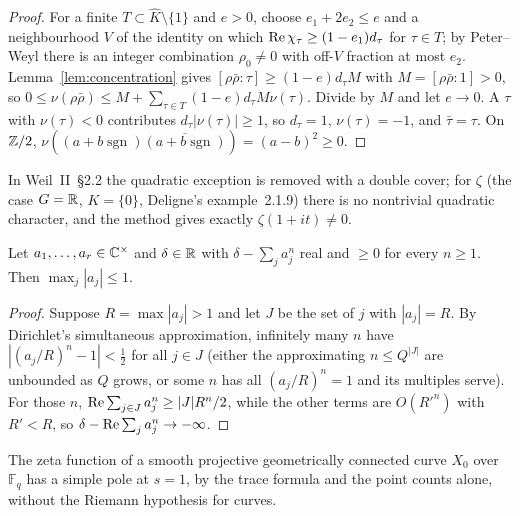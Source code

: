 \begin{proof}
For a finite $T\subset\widehat K\setminus\{1\}$ and $e>0$, choose $e_1+2e_2\le e$ and a neighbourhood $V$ of the identity on which $\operatorname{Re}\chi_\tau\ge(1-e_1)d_\tau$ for $\tau\in T$; by Peter--Weyl there is an integer combination $\rho_0\ne0$ with off-$V$ fraction at most $e_2$. Lemma~\ref{lem:concentration} gives $[\rho\bar\rho:\tau]\ge(1-e)d_\tau M$ with $M=[\rho\bar\rho:1]>0$, so $0\le\nu(\rho\bar\rho)\le M+\sum_{\tau\in T}(1-e)d_\tau M\nu(\tau)$. Divide by $M$ and let $e\to0$. A $\tau$ with $\nu(\tau)<0$ contributes $d_\tau|\nu(\tau)|\ge1$, so $d_\tau=1$, $\nu(\tau)=-1$, and $\bar\tau=\tau$. On $\mathbb{Z}/2$, $\nu((a+b\operatorname{sgn})\overline{(a+b\operatorname{sgn})})=(a-b)^2\ge0$.
\end{proof}

In Weil~II~§2.2 the quadratic exception is removed with a double cover; for $\zeta$ (the case $G=\mathbb{R}$, $K=\{0\}$, Deligne's example~2.1.9) there is no nontrivial quadratic character, and the method gives exactly $\zeta(1+it)\ne0$.

\begin{lemma}\label{lem:powersums}
Let $a_1,\dots,a_r\in\mathbb{C}^\times$ and $\delta\in\mathbb{R}$ with $\delta-\sum_ja_j^n$ real and $\ge0$ for every $n\ge1$. Then $\max_j|a_j|\le1$.
\end{lemma}

\begin{proof}
Suppose $R=\max|a_j|>1$ and let $J$ be the set of $j$ with $|a_j|=R$. By Dirichlet's simultaneous approximation, infinitely many $n$ have $|(a_j/R)^n-1|<\tfrac12$ for all $j\in J$ (either the approximating $n\le Q^{|J|}$ are unbounded as $Q$ grows, or some $n$ has all $(a_j/R)^n=1$ and its multiples serve). For those $n$, $\operatorname{Re}\sum_{j\in J}a_j^n\ge|J|R^n/2$, while the other terms are $O(R'^n)$ with $R'<R$, so $\delta-\operatorname{Re}\sum_ja_j^n\to-\infty$.
\end{proof}

\begin{corollary}
The zeta function of a smooth projective geometrically connected curve $X_0$ over $\mathbb{F}_q$ has a simple pole at $s=1$, by the trace formula and the point counts alone, without the Riemann hypothesis for curves.
\end{corollary}

